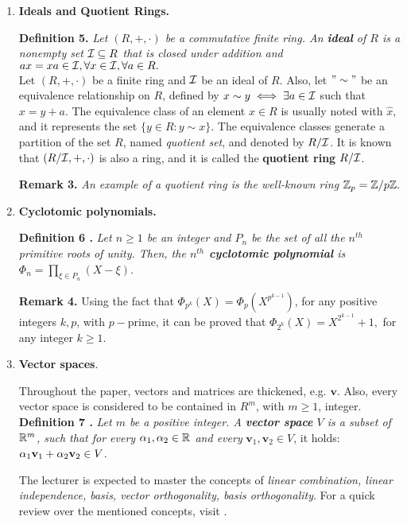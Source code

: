 \begin{enumerate}
	\item \textbf{Ideals and Quotient Rings.} 
	
	\textbf{Definition 5.} \textit{Let $(R, +, \cdot)$ be a commutative finite ring. An \textbf{ideal} of $R$ is a nonempty set $\mathcal{I} \subseteq R$ that is closed under addition and $ax=xa \in \mathcal{I}, \forall x \in \mathcal{I}, \forall a \in R.$} \\
	
	Let $(R, +, \cdot)$ be a finite ring and $\mathcal{I}$ be an ideal of $R$. Also, let $"\sim"$ be an equivalence relationship on $R$, defined by $x \sim y \iff \exists a\in \mathcal{I} $ such that $x = y + a$. The equivalence class of an element $x \in R$ is usually noted with $\hat{x}$, and it represents the set $\{y \in R : y \sim x\}$. The equivalence classes generate a partition of the set $R$, named \textit{quotient set}, and denoted by $R/\mathcal{I}$. It is known that $(R/\mathcal{I}, +, \cdot)$ is also a ring, and it is called the \textbf{quotient ring} $R/\mathcal{I}$.
	
	\textbf{Remark 3.} \textit{An example of a quotient ring is the well-known ring ${\mathbb Z}_p = {\mathbb Z}/p{\mathbb Z}.$}
	
	\item \textbf{Cyclotomic polynomials.}
	
	\textbf{Definition 6 \cite{BB15}.} \textit{Let $n \geq 1$ be an integer and $P_n $ be the set of all the $n^{th}$ primitive roots of unity. Then, the \textbf{$n^{th}$ cyclotomic polynomial} is $\Phi_n = \displaystyle{\prod_{\xi \in P_n}}(X-\xi)$}.
	
	\textbf{Remark 4.} Using the fact that $\Phi_{p^k}(X) = \Phi_p(X^{p^{k-1}})$, for any positive integers $k, p$, with $p-$prime, it can be proved that $\Phi_{2^k}(X) = X^{2^{k-1}} + 1,$ for any integer $k \geq 1$.
	
	\item \textbf{Vector spaces}.
	
	Throughout the paper, vectors and matrices are thickened, e.g. $\textbf{v}$. Also, every vector space is considered to be contained in $R^m$, with $m \geq 1$, integer.\\
	
	\textbf{Definition 7 \cite{HPS08}.} \textit{Let $m$ be a positive integer. A \textbf{vector space} $V$ is a subset of $\mathbb{R}^m$, such that for every $\alpha_1, \alpha_2 \in \mathbb{R}$ and every} $\textbf{v}_1, \textbf{v}_2 \in V$, it holds: $\alpha_1 \textbf{v}_1 + \alpha_2 \textbf{v}_2\in V$.
	
	The lecturer is expected to master the concepts of \textit{linear combination, linear independence, basis, vector orthogonality, basis orthogonality}. For a quick review over the mentioned concepts, visit \cite{HPS08}.\\
	

\end{enumerate}
